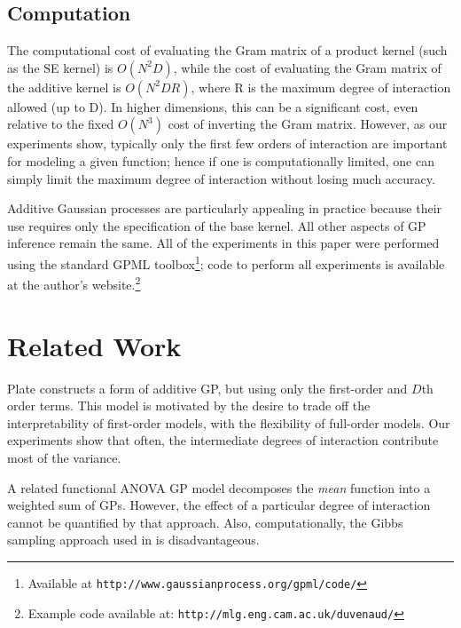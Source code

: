 \subsection{Computation}
The computational cost of evaluating the Gram matrix of a product kernel (such as the SE kernel) is $O(N^2D)$, while the cost of evaluating the Gram matrix of the additive kernel is $O(N^2DR)$, where R is the maximum degree of interaction allowed (up to D).  In higher dimensions, this can be a significant cost, even relative to the fixed $O(N^3)$ cost of inverting the Gram matrix.
%
However, as our experiments show, typically only the first few orders of interaction are important for modeling a given function; hence if one is computationally limited, one can simply limit the maximum degree of interaction without losing much accuracy.

Additive Gaussian processes are particularly appealing in practice because their use requires only the specification of the base kernel.  All other aspects of GP inference remain the same.  All of the experiments in this paper were performed using the standard GPML toolbox\footnote{Available at \texttt{http://www.gaussianprocess.org/gpml/code/}}; code to perform all experiments is available at the author's website.\footnote{Example code available at: \texttt{http://mlg.eng.cam.ac.uk/duvenaud/}}


\section{Related Work}

Plate\cite{plate1999accuracy} constructs a form of additive GP, but using only the first-order and $D$th order terms.  This model is motivated by the desire to trade off the interpretability of first-order models, with the flexibility of full-order models.  Our experiments show that often, the intermediate degrees of interaction contribute most of the variance.

A related functional ANOVA GP model\cite{kaufman2010bayesian} decomposes the \emph{mean} function into a weighted sum of GPs. However, the effect of a particular degree of interaction cannot be quantified by that approach. Also, computationally, the Gibbs sampling approach used in \cite{kaufman2010bayesian} is disadvantageous.

